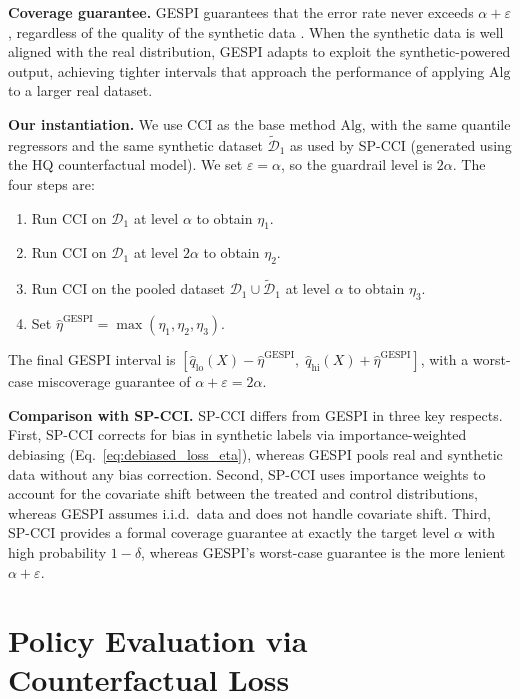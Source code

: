 \documentclass{article}
\theoremstyle{plain}
\theoremstyle{definition}
\theoremstyle{remark}
\begin{document}
\textbf{Coverage guarantee.} GESPI guarantees that the error rate never exceeds $\alpha + \varepsilon$, regardless of the quality of the synthetic data \citep{bashari2026statistical}. When the synthetic data is well aligned with the real distribution, GESPI adapts to exploit the synthetic-powered output, achieving tighter intervals that approach the performance of applying $\mathrm{Alg}$ to a larger real dataset.

\textbf{Our instantiation.} We use CCI \citep{lei2021conformal} as the base method $\mathrm{Alg}$, with the same quantile regressors and the same synthetic dataset $\tilde{\mathcal{D}}_1$ as used by SP-CCI (generated using the HQ counterfactual model). We set $\varepsilon = \alpha$, so the guardrail level is $2\alpha$. The four steps are:
\begin{enumerate}
    \item Run CCI on $\mathcal{D}_1$ at level $\alpha$ to obtain $\eta_1$.
    \item Run CCI on $\mathcal{D}_1$ at level $2\alpha$ to obtain $\eta_2$.
    \item Run CCI on the pooled dataset $\mathcal{D}_1 \cup \tilde{\mathcal{D}}_1$ at level $\alpha$ to obtain $\eta_3$.
    \item Set $\hat{\eta}^{\text{GESPI}} = \max(\eta_1, \eta_2, \eta_3)$.
\end{enumerate}
The final GESPI interval is $[\hat{q}_{\text{lo}}(X) - \hat{\eta}^{\text{GESPI}},\; \hat{q}_{\text{hi}}(X) + \hat{\eta}^{\text{GESPI}}]$, with a worst-case miscoverage guarantee of $\alpha + \varepsilon = 2\alpha$.

\textbf{Comparison with SP-CCI.} SP-CCI differs from GESPI in three key respects. First, SP-CCI corrects for bias in synthetic labels via importance-weighted debiasing (Eq.~\ref{eq:debiased_loss_eta}), whereas GESPI pools real and synthetic data without any bias correction. Second, SP-CCI uses importance weights to account for the covariate shift between the treated and control distributions, whereas GESPI assumes i.i.d.\ data and does not handle covariate shift. Third, SP-CCI provides a formal coverage guarantee at exactly the target level $\alpha$ with high probability $1-\delta$, whereas GESPI's worst-case guarantee is the more lenient $\alpha + \varepsilon$.


\section{Policy Evaluation via Counterfactual Loss}
\label{sec:real-world}
\end{document}
